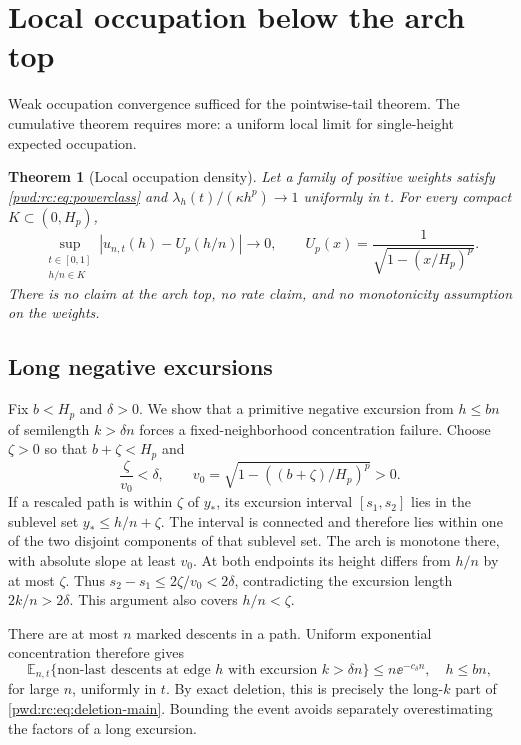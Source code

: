 \documentclass[11pt,letterpaper]{article}
\numberwithin{equation}{section}
\newtheorem{theorem}{Theorem}[section]
\theoremstyle{remark}\newtheorem{remark}[theorem]{Remark}
\newcommand{\E}{\mathbb E}\newcommand{\Prob}{\mathbb P}
\begin{document}
\section{Local occupation below the arch top}\label{pwd:rc:sec:local}
Weak occupation convergence sufficed for the pointwise-tail theorem. The cumulative theorem requires more: a uniform local limit for single-height expected occupation.

\begin{theorem}[Local occupation density]\label{pwd:rc:thm:local}
Let a family of positive weights satisfy \eqref{pwd:rc:eq:powerclass} and $\lambda_h(t)/(\kappa h^p)\to1$ uniformly in $t$. For every compact $K\subset(0,H_p)$,
\begin{equation}\label{pwd:rc:eq:local}
 \sup_{\substack{t\in[0,1]\\h/n\in K}}
 \left|u_{n,t}(h)-U_p(h/n)\right|\longrightarrow0,
 \qquad U_p(x)=\frac1{\sqrt{1-(x/H_p)^p}}.
\end{equation}
There is no claim at the arch top, no rate claim, and no monotonicity assumption on the weights.
\end{theorem}

\subsection{Long negative excursions}
Fix $b<H_p$ and $\delta>0$. We show that a primitive negative excursion from $h\le bn$ of semilength $k>\delta n$ forces a fixed-neighborhood concentration failure. Choose $\zeta>0$ so that $b+\zeta<H_p$ and
\[
 \frac\zeta{v_0}<\delta,\qquad
 v_0=\sqrt{1-((b+\zeta)/H_p)^p}>0.
\]
If a rescaled path is within $\zeta$ of $y_*$, its excursion interval $[s_1,s_2]$ lies in the sublevel set $y_*\le h/n+\zeta$. The interval is connected and therefore lies within one of the two disjoint components of that sublevel set. The arch is monotone there, with absolute slope at least $v_0$. At both endpoints its height differs from $h/n$ by at most $\zeta$. Thus $s_2-s_1\le2\zeta/v_0<2\delta$, contradicting the excursion length $2k/n>2\delta$. This argument also covers $h/n<\zeta$.

There are at most $n$ marked descents in a path. Uniform exponential concentration therefore gives
\begin{equation}\label{pwd:rc:eq:long-excursions}
 \E_{n,t}\{\text{non-last descents at edge $h$ with excursion }k>\delta n\}
 \le n\ee^{-c_\delta n},\quad h\le bn,
\end{equation}
for large $n$, uniformly in $t$. By exact deletion, this is precisely the long-$k$ part of \eqref{pwd:rc:eq:deletion-main}. Bounding the event avoids separately overestimating the factors of a long excursion.
\end{document}
